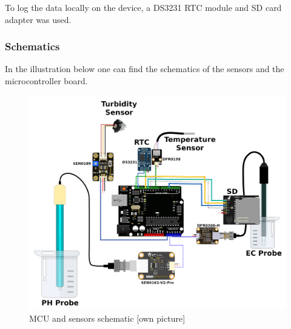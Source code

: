 To log the data locally on the device, a DS3231 RTC module and SD card adapter was used.

\newpage
\subsubsection{Schematics}
In the illustration below one can find the schematics of the sensors and the microcontroller board.
\begin{figure}[h]
\centering
\includegraphics[scale=0.8]{070_design/sensors/47_schematic.png}
\caption{MCU and sensors schematic [own picture]}
\end{figure}

